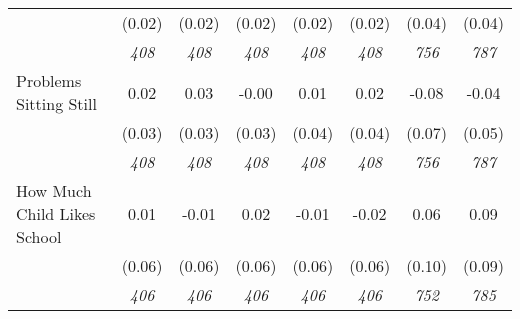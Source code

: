 \begin{tabular}{l c c c c c c c}
& (0.02) & (0.02) & (0.02) & (0.02) & (0.02) & (0.04) & (0.04) \\
& \textit{ 408 } & \textit{ 408 } & \textit{ 408 } & \textit{ 408 } & \textit{ 408 } & \textit{ 756 } & \textit{ 787 } \\
Problems Sitting Still & 0.02 & 0.03 & -0.00 & 0.01 & 0.02 & -0.08 & -0.04 \\
& (0.03) & (0.03) & (0.03) & (0.04) & (0.04) & (0.07) & (0.05) \\
& \textit{ 408 } & \textit{ 408 } & \textit{ 408 } & \textit{ 408 } & \textit{ 408 } & \textit{ 756 } & \textit{ 787 } \\
How Much Child Likes School & 0.01 & -0.01 & 0.02 & -0.01 & -0.02 & 0.06 & 0.09 \\
& (0.06) & (0.06) & (0.06) & (0.06) & (0.06) & (0.10) & (0.09) \\
& \textit{ 406 } & \textit{ 406 } & \textit{ 406 } & \textit{ 406 } & \textit{ 406 } & \textit{ 752 } & \textit{ 785 } \\
\bottomrule
\end{tabular}
